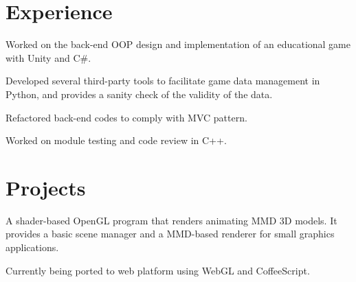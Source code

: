 \documentclass[]{deedy-resume-openfont}
\begin{document}
\hfill
\begin{minipage}[t]{0.66\textwidth} 


\section{Experience}

\vspace{\topsep} %
\begin{tightemize} 
\item Worked on the back-end OOP design and implementation of an educational game with Unity and C\#.
\item Developed several third-party tools to facilitate game data management in Python, and provides a sanity check of the validity of the data.
\item Refactored back-end codes to comply with MVC pattern.
\end{tightemize}
\sectionsep

\begin{tightemize} 
\item Worked on module testing and code review in C++.
\end{tightemize}
\sectionsep


\section{Projects}

\begin{tightemize} 
\item A shader-based OpenGL program that renders animating MMD 3D models. It provides a basic scene manager and a MMD-based renderer for small graphics applications.
\item Currently being ported to web platform using WebGL and CoffeeScript.
\end{tightemize}
\sectionsep


\end{minipage}
\end{document}
